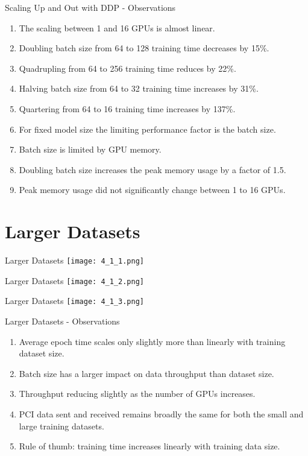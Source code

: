 \documentclass[t]{beamer}
\begin{document}
\begin{frame}{Scaling Up and Out with DDP - Observations}

\begin{enumerate}
  \item The scaling between 1 and 16 GPUs is almost linear.
  \item Doubling batch size from 64 to 128 training time decreases by 15\%.
  \item Quadrupling from 64 to 256 training time reduces by 22\%.
  \item Halving batch size from 64 to 32 training time increases by 31\%.
  \item Quartering from 64 to 16 training time increases by 137\%.
  \item For fixed model size the limiting performance factor is the batch size.
  \item Batch size is limited by GPU memory.
  \item Doubling batch size increases the peak memory usage by a factor of 1.5.
  \item Peak memory usage did not significantly change between 1 to 16 GPUs.
\end{enumerate}

\end{frame}

\section{Larger Datasets}

\begin{frame}{Larger Datasets}
\texttt{[image: 4\_1\_1.png]}
\end{frame}

\begin{frame}{Larger Datasets}
\texttt{[image: 4\_1\_2.png]}
\end{frame}

\begin{frame}{Larger Datasets}
\texttt{[image: 4\_1\_3.png]}
\end{frame}

\begin{frame}{Larger Datasets - Observations}

\begin{enumerate}
  \item Average epoch time scales only slightly more than linearly with training dataset size.
  \item Batch size has a larger impact on data throughput than dataset size.
  \item Throughput reducing slightly as the number of GPUs increases.
  \item PCI data sent and received remains broadly the same for both the small and large training datasets.
  \item Rule of thumb: training time increases linearly with training data size.
\end{enumerate}

\end{frame}
\end{document}
